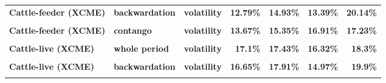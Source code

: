 \documentclass[
  authoryear,
  preprint,
  3p]{elsarticle}
\begin{document}
\begin{longtable}[t]{>{}l>{}l>{}l>{}r>{}r>{}r>{}r}
\textbf{Cattle-feeder (XCME)} & \textbf{backwardation} & \textbf{volatility} & \textcolor[HTML]{4285f4}{\textbf{12.79\%}} & \textcolor[HTML]{4285f4}{\textbf{14.93\%}} & \textcolor[HTML]{4285f4}{\textbf{13.39\%}} & \textcolor[HTML]{4285f4}{\textbf{20.14\%}}\\
\addlinespace
\textbf{\cellcolor{gray!10}{Cattle-feeder (XCME)}} & \textbf{\cellcolor{gray!10}{contango}} & \textbf{\cellcolor{gray!10}{mean}} & \textcolor[HTML]{4285f4}{\textbf{\cellcolor{gray!10}{-0.81\%}}} & \textcolor[HTML]{4285f4}{\textbf{\cellcolor{gray!10}{-5.49\%}}} & \textcolor[HTML]{4285f4}{\textbf{\cellcolor{gray!10}{7.28\%}}} & \textcolor[HTML]{4285f4}{\textbf{\cellcolor{gray!10}{-3.12\%}}}\\
\textbf{Cattle-feeder (XCME)} & \textbf{contango} & \textbf{volatility} & \textcolor[HTML]{4285f4}{\textbf{13.67\%}} & \textcolor[HTML]{4285f4}{\textbf{15.35\%}} & \textcolor[HTML]{4285f4}{\textbf{16.91\%}} & \textcolor[HTML]{4285f4}{\textbf{17.23\%}}\\
\textbf{\cellcolor{gray!10}{Cattle-live (XCME)}} & \textbf{\cellcolor{gray!10}{whole period}} & \textbf{\cellcolor{gray!10}{mean}} & \textcolor[HTML]{4285f4}{\textbf{\cellcolor{gray!10}{3.45\%}}} & \textcolor[HTML]{4285f4}{\textbf{\cellcolor{gray!10}{8.77\%}}} & \textcolor[HTML]{4285f4}{\textbf{\cellcolor{gray!10}{4.13\%}}} & \textcolor[HTML]{4285f4}{\textbf{\cellcolor{gray!10}{1.92\%}}}\\
\textbf{Cattle-live (XCME)} & \textbf{whole period} & \textbf{volatility} & \textcolor[HTML]{4285f4}{\textbf{17.1\%}} & \textcolor[HTML]{4285f4}{\textbf{17.43\%}} & \textcolor[HTML]{4285f4}{\textbf{16.32\%}} & \textcolor[HTML]{4285f4}{\textbf{18.3\%}}\\
\textbf{\cellcolor{gray!10}{Cattle-live (XCME)}} & \textbf{\cellcolor{gray!10}{backwardation}} & \textbf{\cellcolor{gray!10}{mean}} & \textcolor[HTML]{4285f4}{\textbf{\cellcolor{gray!10}{8.39\%}}} & \textcolor[HTML]{4285f4}{\textbf{\cellcolor{gray!10}{14.2\%}}} & \textcolor[HTML]{4285f4}{\textbf{\cellcolor{gray!10}{5.87\%}}} & \textcolor[HTML]{4285f4}{\textbf{\cellcolor{gray!10}{-2.07\%}}}\\
\addlinespace
\textbf{Cattle-live (XCME)} & \textbf{backwardation} & \textbf{volatility} & \textcolor[HTML]{4285f4}{\textbf{16.65\%}} & \textcolor[HTML]{4285f4}{\textbf{17.91\%}} & \textcolor[HTML]{4285f4}{\textbf{14.97\%}} & \textcolor[HTML]{4285f4}{\textbf{19.9\%}}\\
\textbf{\cellcolor{gray!10}{Cattle-live (XCME)}} & \textbf{\cellcolor{gray!10}{contango}} & \textbf{\cellcolor{gray!10}{mean}} & \textcolor[HTML]{4285f4}{\textbf{\cellcolor{gray!10}{-0.34\%}}} & \textcolor[HTML]{4285f4}{\textbf{\cellcolor{gray!10}{3.43\%}}} & \textcolor[HTML]{4285f4}{\textbf{\cellcolor{gray!10}{2.7\%}}} & \textcolor[HTML]{4285f4}{\textbf{\cellcolor{gray!10}{5.82\%}}}\\

\end{longtable}
\end{document}
